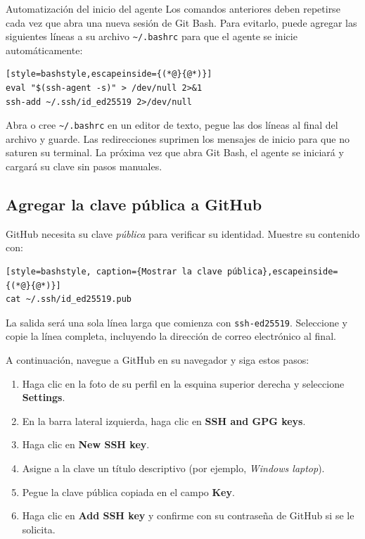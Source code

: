 \begin{tipbox}{Automatización del inicio del agente}
Los comandos anteriores deben repetirse cada vez que abra una nueva sesión de Git Bash. Para evitarlo, puede agregar las siguientes líneas a su archivo \texttt{\textasciitilde/.bashrc} para que el agente se inicie automáticamente:

\begin{lstlisting}[style=bashstyle,escapeinside={(*@}{@*)}]
eval "$(ssh-agent -s)" > /dev/null 2>&1
ssh-add ~/.ssh/id_ed25519 2>/dev/null
\end{lstlisting}

Abra o cree \texttt{\textasciitilde/.bashrc} en un editor de texto, pegue las dos líneas al final del archivo y guarde. Las redirecciones suprimen los mensajes de inicio para que no saturen su terminal. La próxima vez que abra Git Bash, el agente se iniciará y cargará su clave sin pasos manuales.
\end{tipbox}

\subsection{Agregar la clave pública a GitHub}

GitHub necesita su clave \emph{pública} para verificar su identidad. Muestre su contenido con:

\begin{lstlisting}[style=bashstyle, caption={Mostrar la clave pública},escapeinside={(*@}{@*)}]
cat ~/.ssh/id_ed25519.pub
\end{lstlisting}

La salida será una sola línea larga que comienza con \texttt{ssh-ed25519}. Seleccione y copie la línea completa, incluyendo la dirección de correo electrónico al final.

A continuación, navegue a GitHub en su navegador y siga estos pasos:

\begin{enumerate}
    \item Haga clic en la foto de su perfil en la esquina superior derecha y seleccione \textbf{Settings}.
    \item En la barra lateral izquierda, haga clic en \textbf{SSH and GPG keys}.
    \item Haga clic en \textbf{New SSH key}.
    \item Asigne a la clave un título descriptivo (por ejemplo, \textit{Windows laptop}).
    \item Pegue la clave pública copiada en el campo \textbf{Key}.
    \item Haga clic en \textbf{Add SSH key} y confirme con su contraseña de GitHub si se le solicita.
\end{enumerate}

